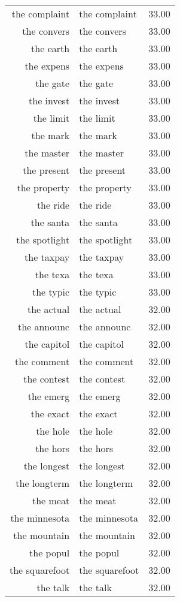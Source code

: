 \begin{table}[ht]
\begin{tabular}{rlr}
  the complaint & the complaint & 33.00 \\ 
  the convers & the convers & 33.00 \\ 
  the earth & the earth & 33.00 \\ 
  the expens & the expens & 33.00 \\ 
  the gate & the gate & 33.00 \\ 
  the invest & the invest & 33.00 \\ 
  the limit & the limit & 33.00 \\ 
  the mark & the mark & 33.00 \\ 
  the master & the master & 33.00 \\ 
  the present & the present & 33.00 \\ 
  the property & the property & 33.00 \\ 
  the ride & the ride & 33.00 \\ 
  the santa & the santa & 33.00 \\ 
  the spotlight & the spotlight & 33.00 \\ 
  the taxpay & the taxpay & 33.00 \\ 
  the texa & the texa & 33.00 \\ 
  the typic & the typic & 33.00 \\ 
  the actual & the actual & 32.00 \\ 
  the announc & the announc & 32.00 \\ 
  the capitol & the capitol & 32.00 \\ 
  the comment & the comment & 32.00 \\ 
  the contest & the contest & 32.00 \\ 
  the emerg & the emerg & 32.00 \\ 
  the exact & the exact & 32.00 \\ 
  the hole & the hole & 32.00 \\ 
  the hors & the hors & 32.00 \\ 
  the longest & the longest & 32.00 \\ 
  the longterm & the longterm & 32.00 \\ 
  the meat & the meat & 32.00 \\ 
  the minnesota & the minnesota & 32.00 \\ 
  the mountain & the mountain & 32.00 \\ 
  the popul & the popul & 32.00 \\ 
  the squarefoot & the squarefoot & 32.00 \\ 
  the talk & the talk & 32.00 \\ 

\end{tabular}
\end{table}

